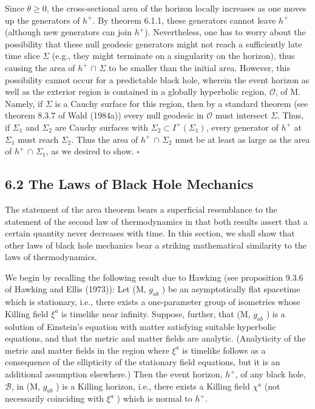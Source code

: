 \documentclass[11pt,a4paper]{article}
\begin{document}
Since \(\theta \geq 0\), the cross-sectional area of the horizon locally increases as one moves up the generators of \(h^+\). By theorem 6.1.1, these generators cannot leave \(h^+\) (although new generators can join \(h^+\)). Nevertheless, one has to worry about the possibility that these null geodesic generators might not reach a sufficiently late time slice \(\Sigma\) (e.g., they might terminate on a singularity on the horizon), thus causing the area of \(h^+\) \(\cap\) \(\Sigma\) to be smaller than the initial area. However, this possibility cannot occur for a predictable black hole, wherein the event horizon as well as the exterior region is contained in a globally hyperbolic region, \(\mathcal O\), of M. Namely, if \(\Sigma\) is a Cauchy surface for this region, then by a standard theorem (see theorem 8.3.7 of Wald (1984a)) every null geodesic in \(\mathcal O\) must intersect \(\Sigma\). Thus, if \(\Sigma_1\) and \(\Sigma_2\) are Cauchy surfaces with \(\Sigma_2 \subset I^+(\Sigma_1)\), every generator of \(h^+\) at \(\Sigma_1\) must reach \(\Sigma_2\). Thus the area of \(h^+\) \(\cap\) \(\Sigma_2\) must be at least as large as the area of \(h^+\) \(\cap\) \(\Sigma_1\), as we desired to show. \(\square\)

\subsection*{6.2 The Laws of Black Hole Mechanics}\hypertarget{sec:6.2}{}

The statement of the area theorem bears a superficial resemblance to the statement of the second law of thermodynamics in that both results assert that a certain quantity never decreases with time. In this section, we shall show that other laws of black hole mechanics bear a striking mathematical similarity to the laws of thermodynamics.

We begin by recalling the following result due to Hawking (see \hypertarget{source-153}{} proposition 9.3.6 of Hawking and Ellis (1973)): Let (M, \(g_{ab}\) ) be an asymptotically flat spacetime which is stationary, i.e., there exists a one-parameter group of isometries whose Killing field \(\xi^a\) is timelike near infinity. Suppose, further, that (M, \(g_{ab}\) ) is a solution of Einstein's equation with matter satisfying suitable hyperbolic equations, and that the metric and matter fields are analytic. (Analyticity of the metric and matter fields in the region where \(\xi^a\) is timelike follows as a consequence of the ellipticity of the stationary field equations, but it is an additional assumption elsewhere.) Then the event horizon, \(h^+\), of any black hole, \(\mathcal{B}\), in (M, \(g_{ab}\) ) is a Killing horizon, i.e., there exists a Killing field \(\chi^a\) (not necessarily coinciding with \(\xi^a\) ) which is normal to \(h^+\).
\end{document}
